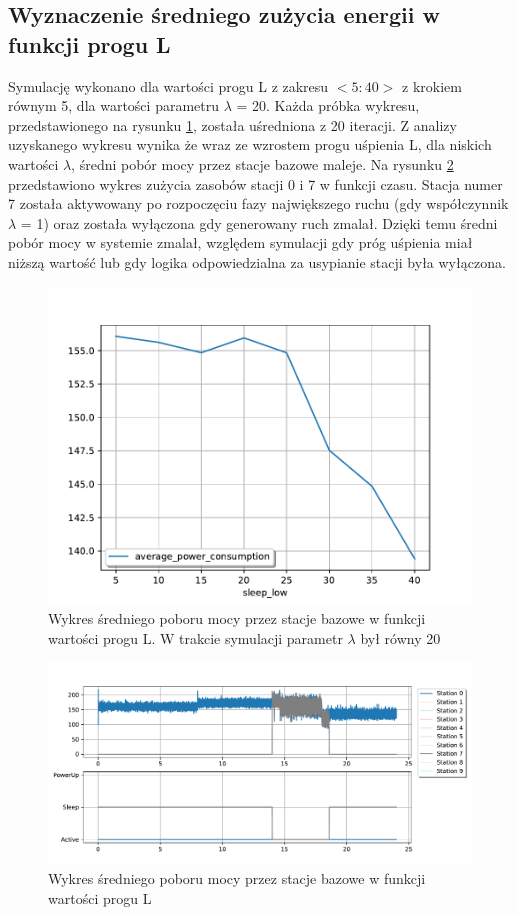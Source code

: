 \subsection{Wyznaczenie średniego zużycia energii w funkcji progu L} \label{power_l_plot}
Symulację wykonano dla wartości progu L z zakresu $<5:40>$ z krokiem równym 5, dla wartości parametru $\lambda$ = 20. Każda próbka wykresu, przedstawionego na rysunku \ref{power_usage_lambda_sleep}, została uśredniona z 20 iteracji. Z analizy uzyskanego wykresu wynika że wraz ze wzrostem progu uśpienia L, dla niskich wartości $\lambda$, średni pobór mocy przez stacje bazowe maleje. Na rysunku \ref{usage_over_time_sleep} przedstawiono wykres zużycia zasobów stacji 0 i 7 w funkcji czasu. Stacja numer 7 została aktywowany po rozpoczęciu fazy największego ruchu (gdy współczynnik $\lambda$ = 1) oraz została wyłączona gdy generowany ruch zmalał. Dzięki temu średni pobór mocy w systemie zmalał, względem symulacji gdy próg uśpienia miał niższą wartość lub gdy logika odpowiedzialna za usypianie stacji była wyłączona.

\begin{figure}[h!]
\center
\includegraphics[scale=0.65]{img/power_usage_lambda_20.pdf} 
\caption{Wykres średniego poboru mocy przez stacje bazowe w funkcji wartości progu L. W trakcie symulacji parametr $\lambda$ był równy 20}
\label{power_usage_lambda_sleep}
\end{figure}

\begin{figure}[h]
\center
\includegraphics[scale=0.65]{img/usage_over_time_sleep.pdf} 
\caption{Wykres średniego poboru mocy przez stacje bazowe w funkcji wartości progu L}
\label{usage_over_time_sleep}
\end{figure}

